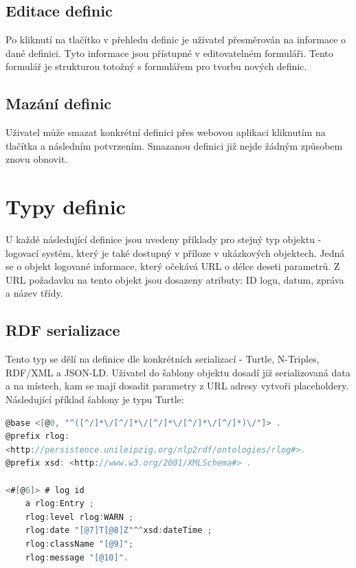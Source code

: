 \documentclass[thesis=B,czech]{FITthesis}[2012/06/26]
\begin{document}
    \subsection{Editace definic}
    Po kliknutí na tlačítko  v přehledu definic je uživatel přesměrován na informace o dané definici.
    Tyto informace jsou přístupné v editovatelném formuláři. Tento formulář je strukturou totožný s 
    formulářem pro tvorbu nových definic.
    
    \subsection{Mazání definic}
    Uživatel může smazat konkrétní definici přes webovou aplikaci kliknutím na tlačítka  a následním potvrzením.
    Smazanou definici již nejde žádným způsobem znovu obnovit.    
    
    \section{Typy definic}\label{def_types}
    U každé následující definice jsou uvedeny příklady pro stejný typ objektu - logovací systém, který je také
    dostupný v příloze v ukázkových objektech. Jedná se o objekt logované informace, který očekává URL o délce deseti parametrů. Z URL požadavku
    na tento objekt jsou dosazeny atributy: ID logu, datum, zpráva a název třídy.
      
    \subsection{RDF serializace}
     Tento typ se dělí na definice dle konkrétních serializací - Turtle, N-Triples, RDF/XML a JSON-LD. Uživatel do šablony objektu dosadí
     již serializovaná data a na místech, kam se mají dosadit parametry z URL adresy vytvoři placeholdery.
     Následující příklad šablony je typu Turtle:
     
     \begin{lstlisting}[language=C, basicstyle=\small,]
@base <[@0, "^([^/]*\/[^/]*\/[^/]*\/[^/]*\/[^/]*)\/"]> .
@prefix rlog: 
<http://persistence.unileipzig.org/nlp2rdf/ontologies/rlog#>.
@prefix xsd: <http://www.w3.org/2001/XMLSchema#> .

<#[@6]> # log id 
	a rlog:Entry ;
  	rlog:level rlog:WARN ;
	rlog:date "[@7]T[@8]Z"^^xsd:dateTime ;
	rlog:className "[@9]";
	rlog:message "[@10]".
\end{lstlisting}
 
\end{document}

